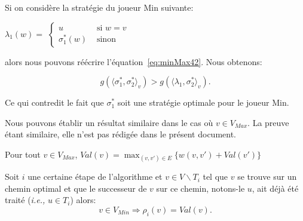 \begin{demonstration}
\begin{description}
		Si on considère la stratégie du joueur Min suivante:
		\begin{center}
		$ \lambda_1(w) =$ $\begin{cases}
							u & \text{ si } w = v\\
							\sigma_1^*(w) & \text{ sinon}
						\end{cases}$
		\end{center}	
		
		alors nous pouvons réécrire l'équation~\eqref{eq:minMax42}. Nous obtenons:
		
		$$ g(\langle \sigma_1^*, \sigma_2^* \rangle_v) > g(\langle \lambda_1, \sigma_2^*\rangle_v).$$
		
		Ce qui contredit le fait que $\sigma_1^*$ soit une stratégie optimale pour le joueur Min.			
			
	\end{description}

\end{demonstration}

Nous pouvons établir un résultat similaire dans le cas où $v \in V_{Max}$. La preuve étant similaire, elle n'est pas rédigée dans le présent document.

\begin{propriete}
	\label{prop:dijk0}
	Pour tout $v \in V_{Max}$, $Val(v) = \max_{(v,v') \in E}\{ w(v,v') + Val(v') \}$
\end{propriete}

\begin{propriete}
	\label{prop:dijk1}
	Soit $i$ une certaine étape de l'algorithme et $v \in V\backslash T_i $ tel que $v$ se trouve sur un chemin optimal et que le successeur de $v$ sur ce chemin, notons-le $u$, ait déjà été traité (\emph{i.e.,} $u \in T_i$) alors:
	$$ v \in V_{Min} \Rightarrow \rho_i(v) = Val(v).$$
\end{propriete}

